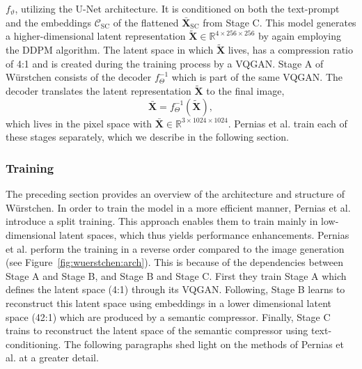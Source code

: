 $f_\vartheta$, utilizing the U-Net architecture. It is conditioned on both the
text-prompt and the embeddings $\mathcal{C}_{\text{SC}}$ of the flattened
$\bar{\boldsymbol{X}}_{\text{SC}}$ from Stage C. This model generates a
higher-dimensional latent representation
$\tilde{\boldsymbol{X}}\in\mathbb{R}^{4\times256\times256}$ by again employing
the DDPM algorithm. The latent space in which $\tilde{\boldsymbol{X}}$ lives,
has a compression ratio of 4:1 and is created during the training process by a
VQGAN. Stage A of W\"urstchen consists of the decoder $f_\Theta^{-1}$ which is
part of the same  VQGAN. The decoder translates the latent representation
$\tilde{\boldsymbol{X}}$ to the final image,
\begin{equation}
    \bar{\boldsymbol{X}} = f_\Theta^{-1}(\tilde{\boldsymbol{X}}),
\end{equation}
which lives in the pixel space with $\bar{\boldsymbol{X}}\in\mathbb{R}^{3\times1024\times1024}$.
Pernias et al. train each of these stages separately, which we describe in the
following section.

\subsubsection{Training}
\label{sec:wuerstchen:training}
The preceding section provides an overview of the architecture and structure
of W\"urstchen.
In order to train the model in a more efficient manner, Pernias et
al.~\cite{pernias2024wrstchen} introduce a split training. This approach enables
them to train mainly in low-dimensional latent spaces, which thus yields
performance enhancements. Pernias et al. perform the training in a reverse order
compared to the image generation (see Figure~\ref{fig:wuerstchen:arch}). This is
because of the dependencies between Stage A and Stage B, and Stage B and Stage C.
First they train Stage A which defines the latent space (4:1) through its VQGAN.
Following, Stage B learns to reconstruct this latent space using embeddings in a
lower dimensional latent space (42:1) which are produced by a semantic compressor.
Finally, Stage C trains to reconstruct the latent space of the semantic
compressor using text-conditioning. The following paragraphs shed light on the methods
of Pernias et al. at a greater detail.

